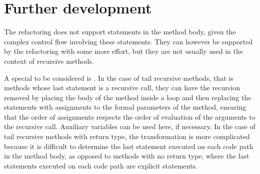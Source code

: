 \chapter{Further development}

The refactoring does not support  statements in the method body, given the complex control flow involving
these statements. They can however be supported by the refactoring with some more effort, but they are not usually used
in the context of recursive methods.

A special to be considered is . In the case of tail recursive methods, that is methods
whose last statement is a recursive call, they can have the recursion removed by placing the body of the method inside a
 loop and then replacing the  statements with assignments to the formal parameters of the
method, ensuring that the order of assignments respects the order of evaluation of the arguments to the recursive call.
Auxiliary variables can be used here, if necessary. In the case of tail recursive methods with  return type,
the transformation is more complicated because it is difficult to determine the last statement executed on each code
path in the method body, as opposed to methods with no  return type, where the last statements executed on
each code path are explicit  statements.